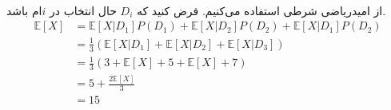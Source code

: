 \\
از امیدریاضی شرطی استفاده می‌کنیم. فرض کنید که
$D_i$
حال انتخاب در
$i$ام
باشد.
\begin{align*}
    \mathbb{E}[X] &= \mathbb{E}[X|D_1] P(D_1) + \mathbb{E}[X|D_2] P(D_2) + \mathbb{E}[X|D_1] P(D_2)\\
    &= \frac{1}{3} (\mathbb{E}[X|D_1] + \mathbb{E}[X|D_2] + \mathbb{E}[X|D_3])\\
    &= \frac{1}{3} (3 + \mathbb{E}[X] + 5 + \mathbb{E}[X] + 7)\\
    &= 5 + \frac{2\mathbb{E}[X]}{3}\\
    &= 15
\end{align*}




